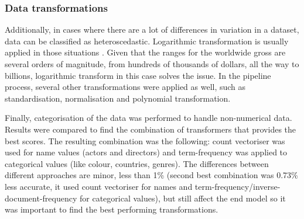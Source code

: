 \subsubsection{Data transformations}
Additionally, in cases where there are a lot of differences in variation in a dataset, data can be classified as heteroscedastic. Logarithmic transformation is usually applied in those situations \cite{kvalheim1994preprocessing}. Given that the ranges for the worldwide gross are several orders of magnitude, from hundreds of thousands of dollars, all the way to billions, logarithmic transform in this case solves the issue. In the pipeline process, several other transformations were applied as well, such as standardisation, normalisation and polynomial transformation. 

Finally, categorisation of the data was performed to handle non-numerical data. Results were compared to find the combination of transformers that provides the best scores. The resulting combination was the following: count vectoriser was used for name values (actors and directors) and term-frequency was applied to categorical values (like colour, countries, genres). The differences between different approaches are minor, less than 1\% (second best combination was 0.73\% less accurate, it used count vectoriser for names and term-frequency/inverse-document-frequency for categorical values), but still affect the end model so it was important to find the best performing transformations.


